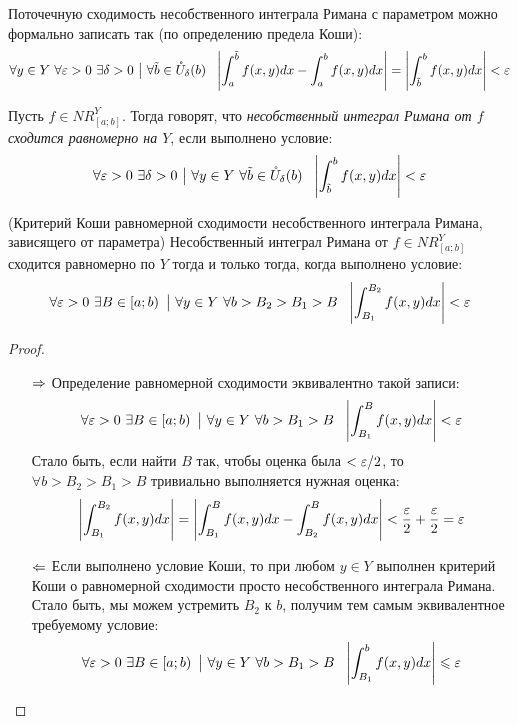 \begin{note}
	Поточечную сходимость несобственного интеграла Римана с параметром можно формально записать так (по определению предела Коши):
	\[
		\forall y \in Y\ \forall \eps > 0\ \exists \delta > 0 \such \forall \tilde{b} \in \mc{U}_\delta(b)\ \ \md{\int_a^{\tilde{b}} f(x, y)dx - \int_a^b f(x, y)dx} = \md{\int_{\tilde{b}}^b f(x, y)dx} < \eps
	\]
\end{note}

\begin{definition}
	Пусть $f \in NR_{[a; b]}^Y$. Тогда говорят, что \textit{несобственный интеграл Римана от $f$ сходится равномерно на $Y$}, если выполнено условие:
	\[
		\forall \varepsilon > 0\ \exists \delta > 0 \ \big|\  \forall y \in Y\ \forall \tilde{b} \in \mathring{U}_\delta(b)\ \ \left|\int_{\tilde{b}}^b f(x, y)dx\right| < \varepsilon
	\]
\end{definition}

\begin{theorem} (Критерий Коши равномерной сходимости несобственного интеграла Римана, зависящего от параметра)
	Несобственный интеграл Римана от $f \in NR_{[a; b]}^Y$ сходится равномерно по $Y$ тогда и только тогда, когда выполнено условие:
	\[
		\forall \eps > 0\ \exists B \in \lsi{a; b} \such \forall y \in Y\ \forall b > B_2 > B_1 > B\ \ \md{\int_{B_1}^{B_2} f(x, y)dx} < \eps
	\]
\end{theorem}

\begin{proof}~
	\begin{itemize}
		\item[$\Rightarrow$] Определение равномерной сходимости эквивалентно такой записи:
		\[
			\forall \varepsilon > 0\ \exists B \in \left[a; b\right) \ \big|\  \forall y \in Y\ \forall b > B_1 > B\ \ \left|\int_{B_1}^B f(x, y)dx\right| < \varepsilon
		\]
		Стало быть, если найти $B$ так, чтобы оценка была $< \varepsilon / 2$, то $\forall b > B_2 > B_1 > B$ тривиально выполняется нужная оценка:
		\[
			\left|\int_{B_1}^{B_2} f(x, y)dx\right| = \left|\int_{B_1}^B f(x, y)dx - \int_{B_2}^B f(x, y)dx\right| < \frac{\varepsilon}{2} + \frac{\varepsilon}{2} = \varepsilon
		\]
		
		\item[$\Leftarrow$] Если выполнено условие Коши, то при любом $y \in Y$ выполнен критерий Коши о равномерной сходимости просто несобственного интеграла Римана. Стало быть, мы можем устремить $B_2$ к $b$, получим тем самым эквивалентное требуемому условие:
		\[
			\forall \varepsilon > 0\ \exists B \in \left[a; b\right) \ \big|\  \forall y \in Y\ \forall b > B_1 > B\ \ \left|\int_{B_1}^b f(x, y)dx\right| \leqslant \varepsilon
		\]
	\end{itemize}
\end{proof}